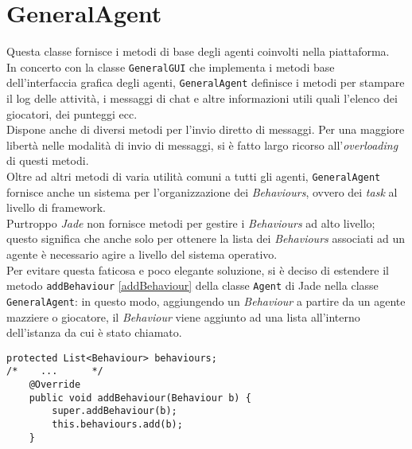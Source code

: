 \section{GeneralAgent}


Questa classe fornisce i metodi di base degli agenti coinvolti nella piattaforma.\\
In concerto con la classe \texttt{GeneralGUI} che implementa i metodi base dell'interfaccia grafica degli agenti, \texttt{GeneralAgent} definisce i metodi per stampare il log delle attività, i messaggi di chat e altre informazioni utili quali l'elenco dei giocatori, dei punteggi ecc.\\
Dispone anche di diversi metodi per l'invio diretto di messaggi. Per una maggiore libertà nelle modalità di invio di messaggi, si è fatto largo ricorso all'\emph{overloading} di questi metodi.\\
Oltre ad altri metodi di varia utilità comuni a tutti gli agenti, \texttt{GeneralAgent} fornisce anche un sistema per l'organizzazione dei \emph{Behaviours}, ovvero dei \emph{task} al livello di framework.\\
Purtroppo \emph{Jade} non fornisce metodi per gestire i \emph{Behaviours} ad alto livello; questo significa che anche solo per ottenere la lista dei \emph{Behaviours} associati ad un agente è necessario agire a livello del sistema operativo.\\
Per evitare questa faticosa e poco elegante soluzione, si è deciso di estendere il metodo \texttt{addBehaviour} \ref{addBehaviour} della classe \texttt{Agent} di Jade nella classe \texttt{GeneralAgent}: in questo modo, aggiungendo un \emph{Behaviour} a partire da un agente mazziere o giocatore, il \emph{Behaviour} viene aggiunto ad una lista all'interno dell'istanza da cui è stato chiamato.

\lstset{numbers=left, numberstyle=\tiny, stepnumber=1,firstnumber=1,
  numbersep=5pt,language=Java,
stringstyle=\ttfamily,
basicstyle=\footnotesize, 
showstringspaces=false,
breaklines=true
}
\begin{lstlisting}[caption={},label=addBehaviour]
protected List<Behaviour> behaviours;
/*    ...      */
    @Override
    public void addBehaviour(Behaviour b) {
        super.addBehaviour(b);
        this.behaviours.add(b);
    }
\end{lstlisting}
